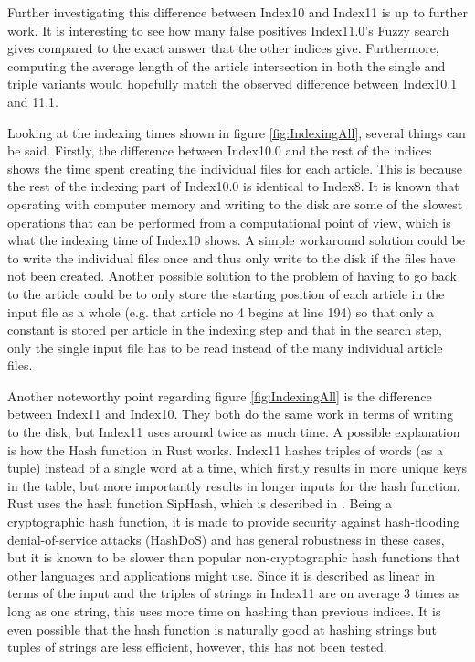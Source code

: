 Further investigating this difference between Index10 and Index11 is up to further work. It is interesting to see how many false positives Index11.0's Fuzzy search gives compared to the exact answer that the other indices give. Furthermore, computing the average length of the article intersection in both the single and triple variants would hopefully match the observed difference between Index10.1 and 11.1. 

Looking at the indexing times shown in figure \ref{fig:IndexingAll}, several things can be said. Firstly, the difference between Index10.0 and the rest of the indices shows the time spent creating the individual files for each article. This is because the rest of the indexing part of Index10.0 is identical to Index8. It is known that operating with computer memory and writing to the disk are some of the slowest operations that can be performed from a computational point of view, which is what the indexing time of Index10 shows. A simple workaround solution could be to write the individual files once and thus only write to the disk if the files have not been created. Another possible solution to the problem of having to go back to the article could be to only store the starting position of each article in the input file as a whole (e.g. that article no 4 begins at line 194) so that only a constant is stored per article in the indexing step and that in the search step, only the single input file has to be read instead of the many individual article files. 

Another noteworthy point regarding figure \ref{fig:IndexingAll} is the difference between Index11 and Index10. They both do the same work in terms of writing to the disk, but Index11 uses around twice as much time. A possible explanation is how the Hash function in Rust works. Index11 hashes triples of words (as a tuple) instead of a single word at a time, which firstly results in more unique keys in the table, but more importantly results in longer inputs for the hash function. Rust uses the hash function SipHash, which is described in \cite{Siphash}. Being a cryptographic hash function, it is made to provide security against hash-flooding denial-of-service attacks (HashDoS) and has general robustness in these cases, but it is known to be slower than popular non-cryptographic hash functions that other languages and applications might use. Since it is described as linear in terms of the input\cite{Siphash} and the triples of strings in Index11 are on average 3 times as long as one string, this uses more time on hashing than previous indices. It is even possible that the hash function is naturally good at hashing strings but tuples of strings are less efficient, however, this has not been tested. 

